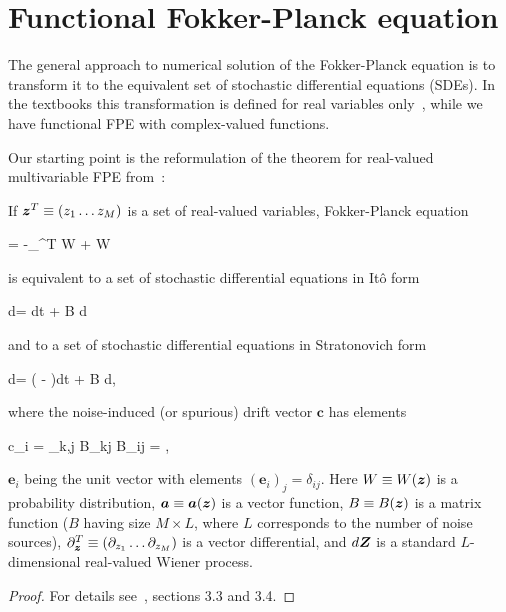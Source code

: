 \section{Functional Fokker-Planck equation}

The general approach to numerical solution of the Fokker-Planck equation is to transform it to the equivalent set of stochastic differential equations (SDEs).
In the textbooks this transformation is defined for real variables only~\cite{Risken1996}, while we have functional FPE with complex-valued functions.

Our starting point is the reformulation of the theorem for real-valued multivariable FPE from~\cite{Risken1996}:

\begin{lemma}
\label{lmm:app-fpe:fpe-sde-real}
    If $\boldsymbol{z}^T \equiv (z_1 \ldots z_M)$ is a set of real-valued variables,
    Fokker-Planck equation
    \begin{eqn*}
    	= -\boldsymbol{\partial}_{\zvec}^T  W
    	+   W
    \end{eqn*}
    is equivalent to a set of stochastic differential equations in It\^{o} form
    \begin{eqn*}
    	d\zvec =  dt + B d\Zvec
    \end{eqn*}
    and to a set of stochastic differential equations in Stratonovich form
    \begin{eqn*}
    	d\zvec = ( - )dt + B d\Zvec,
    \end{eqn*}
    where the noise-induced (or spurious) drift vector $\boldsymbol{c}$ has elements
    \begin{eqn*}
    	c_i
    	= \sum_{k,j} B_{kj}  B_{ij}
    	= ,
    \end{eqn*}
    $\boldsymbol{e}_i$ being the unit vector with elements $(\boldsymbol{e}_i)_j = \delta_{ij}$.
    Here $W \equiv W(\boldsymbol{z})$ is a probability distribution,
    $\boldsymbol{a} \equiv \boldsymbol{a}(\boldsymbol{z})$ is a vector function,
    $B \equiv B(\boldsymbol{z})$ is a matrix function ($B$ having size $M \times L$, where $L$ corresponds to the number of noise sources),
    $\partial_{\boldsymbol{z}}^T \equiv (\partial_{z_1} \ldots \partial_{z_M})$ is a vector differential,
    and $d\boldsymbol{Z}$ is a standard $L$-dimensional real-valued Wiener process.
\end{lemma}
\begin{proof}
For details see~\cite{Risken1996}, sections 3.3 and 3.4.
\end{proof}

